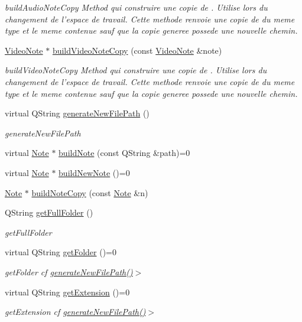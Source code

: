 \begin{DoxyCompactItemize}
\begin{DoxyCompactList}\small\item\em build\-Audio\-Note\-Copy Method qui construire une copie de . Utilise lors du changement de l'espace de travail. Cette methode renvoie une copie de  du meme type et le meme contenue sauf que la copie generee possede une nouvelle chemin. \end{DoxyCompactList}\item 
\hyperlink{class_video_note}{Video\-Note} $\ast$ \hyperlink{class_note_factory_a3cef1deb706b4006cf1d3a8a4e9c7f01}{build\-Video\-Note\-Copy} (const \hyperlink{class_video_note}{Video\-Note} \&note)
\begin{DoxyCompactList}\small\item\em build\-Video\-Note\-Copy Method qui construire une copie de . Utilise lors du changement de l'espace de travail. Cette methode renvoie une copie de  du meme type et le meme contenue sauf que la copie generee possede une nouvelle chemin. \end{DoxyCompactList}\item 
virtual Q\-String \hyperlink{class_note_factory_a89b6f785f1d2ff6db4e3b564cc90920f}{generate\-New\-File\-Path} ()
\begin{DoxyCompactList}\small\item\em generate\-New\-File\-Path \end{DoxyCompactList}\item 
virtual \hyperlink{class_note}{Note} $\ast$ \hyperlink{class_note_factory_aeb1f73ec8c4431b26c2c8e5a5cf9b61e}{build\-Note} (const Q\-String \&path)=0
\item 
virtual \hyperlink{class_note}{Note} $\ast$ \hyperlink{class_note_factory_a11a2ce27fca508cea830c6a81e9c565c}{build\-New\-Note} ()=0
\item 
\hyperlink{class_note}{Note} $\ast$ \hyperlink{class_note_factory_a4b9c026e47b2e73d03da1608c32a7e3c}{build\-Note\-Copy} (const \hyperlink{class_note}{Note} \&n)
\item 
Q\-String \hyperlink{class_note_factory_aa58aa11f6cb9370065169936a4f633af}{get\-Full\-Folder} ()
\begin{DoxyCompactList}\small\item\em get\-Full\-Folder \end{DoxyCompactList}\item 
virtual Q\-String \hyperlink{class_note_factory_a9d4c924038af855a7c4a51455b13ab83}{get\-Folder} ()=0
\begin{DoxyCompactList}\small\item\em get\-Folder cf \hyperlink{class_note_factory_a89b6f785f1d2ff6db4e3b564cc90920f}{generate\-New\-File\-Path()}$>$ \end{DoxyCompactList}\item 
virtual Q\-String \hyperlink{class_note_factory_ae1d2bbb4cb15be1976957ccc0bca87a2}{get\-Extension} ()=0
\begin{DoxyCompactList}\small\item\em get\-Extension cf \hyperlink{class_note_factory_a89b6f785f1d2ff6db4e3b564cc90920f}{generate\-New\-File\-Path()}$>$ \end{DoxyCompactList}\end{DoxyCompactItemize}
